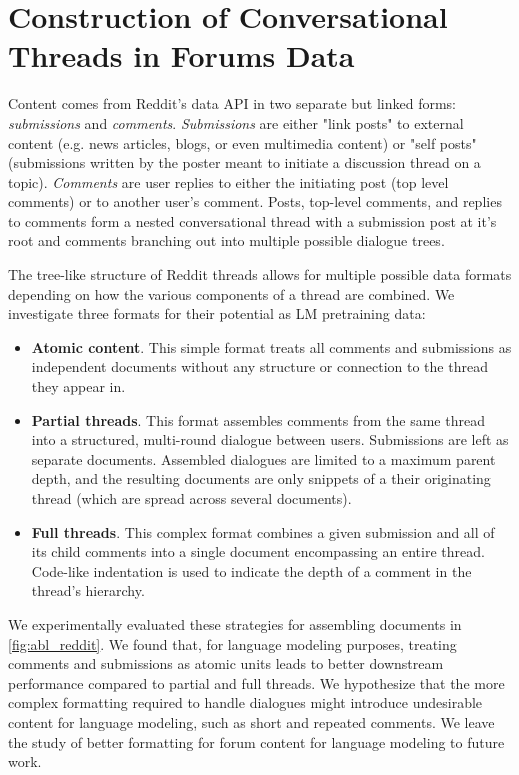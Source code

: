\documentclass{article}
\begin{document}
\section{Construction of Conversational Threads in Forums Data} 
\label{sec:how-to-thread}

Content comes from Reddit's data API in two separate but linked forms: \textit{submissions} and \textit{comments}. \textit{Submissions} are either "link posts" to external content (e.g. news articles, blogs, or even multimedia content) or "self posts" (submissions written by the poster meant to initiate a discussion thread on a topic). \textit{Comments} are user replies to either the initiating post (top level comments) or to another user's comment. Posts, top-level comments, and replies to comments form a nested conversational thread with a submission post at it's root and comments branching out into multiple possible dialogue trees. 

The tree-like structure of Reddit threads allows for multiple possible data formats depending on how the various components of a thread are combined. 
We investigate three formats for their potential as LM pretraining data:
\begin{itemize}[leftmargin=1em]
    \item \textbf{Atomic content}. This simple format treats all comments and submissions as independent documents without any structure or connection to the thread they appear in.
    \item \textbf{Partial threads}. This format assembles comments from the same thread into a structured, multi-round dialogue between users. Submissions are left as separate documents. Assembled dialogues are limited to a maximum parent depth, and the resulting documents are only snippets of a their originating thread (which are spread across several documents).
    \item \textbf{Full threads}. This complex format combines a given submission and all of its child comments into a single document encompassing an entire thread. Code-like indentation is used to indicate the depth of a comment in the thread's hierarchy.
\end{itemize}

We experimentally evaluated these strategies for assembling documents in \autoref{fig:abl_reddit}. We found that, for language modeling purposes, treating comments and submissions as atomic units leads to better downstream performance compared to partial and full threads. 
We hypothesize that the more complex formatting required to handle dialogues might introduce undesirable content for language modeling, such as short and repeated comments. 
We leave the study of better formatting for forum content for language modeling to future work.
\end{document}
